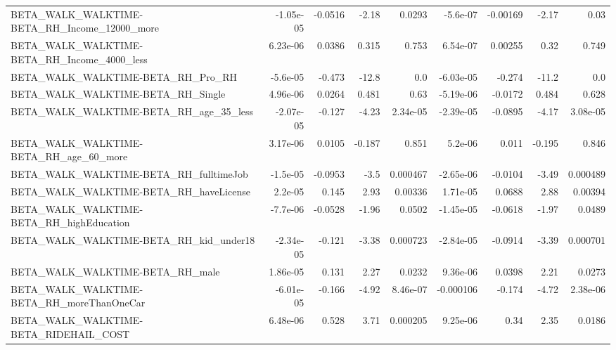 \begin{tabular}{lrrrrrrrr}
BETA\_WALK\_WALKTIME-BETA\_RH\_Income\_12000\_more       &   -1.05e-05 &      -0.0516 &     -2.18 &   0.0293 &   -5.6e-07 &    -0.00169 &        -2.17 &          0.03 \\
BETA\_WALK\_WALKTIME-BETA\_RH\_Income\_4000\_less        &    6.23e-06 &       0.0386 &     0.315 &    0.753 &   6.54e-07 &     0.00255 &         0.32 &         0.749 \\
BETA\_WALK\_WALKTIME-BETA\_RH\_Pro\_RH                  &    -5.6e-05 &       -0.473 &     -12.8 &      0.0 &  -6.03e-05 &      -0.274 &        -11.2 &           0.0 \\
BETA\_WALK\_WALKTIME-BETA\_RH\_Single                  &    4.96e-06 &       0.0264 &     0.481 &     0.63 &  -5.19e-06 &     -0.0172 &        0.484 &         0.628 \\
BETA\_WALK\_WALKTIME-BETA\_RH\_age\_35\_less             &   -2.07e-05 &       -0.127 &     -4.23 & 2.34e-05 &  -2.39e-05 &     -0.0895 &        -4.17 &      3.08e-05 \\
BETA\_WALK\_WALKTIME-BETA\_RH\_age\_60\_more             &    3.17e-06 &       0.0105 &    -0.187 &    0.851 &    5.2e-06 &       0.011 &       -0.195 &         0.846 \\
BETA\_WALK\_WALKTIME-BETA\_RH\_fulltimeJob             &    -1.5e-05 &      -0.0953 &      -3.5 & 0.000467 &  -2.65e-06 &     -0.0104 &        -3.49 &      0.000489 \\
BETA\_WALK\_WALKTIME-BETA\_RH\_haveLicense             &     2.2e-05 &        0.145 &      2.93 &  0.00336 &   1.71e-05 &      0.0688 &         2.88 &       0.00394 \\
BETA\_WALK\_WALKTIME-BETA\_RH\_highEducation           &    -7.7e-06 &      -0.0528 &     -1.96 &   0.0502 &  -1.45e-05 &     -0.0618 &        -1.97 &        0.0489 \\
BETA\_WALK\_WALKTIME-BETA\_RH\_kid\_under18             &   -2.34e-05 &       -0.121 &     -3.38 & 0.000723 &  -2.84e-05 &     -0.0914 &        -3.39 &      0.000701 \\
BETA\_WALK\_WALKTIME-BETA\_RH\_male                    &    1.86e-05 &        0.131 &      2.27 &   0.0232 &   9.36e-06 &      0.0398 &         2.21 &        0.0273 \\
BETA\_WALK\_WALKTIME-BETA\_RH\_moreThanOneCar          &   -6.01e-05 &       -0.166 &     -4.92 & 8.46e-07 &  -0.000106 &      -0.174 &        -4.72 &      2.38e-06 \\
BETA\_WALK\_WALKTIME-BETA\_RIDEHAIL\_COST              &    6.48e-06 &        0.528 &      3.71 & 0.000205 &   9.25e-06 &        0.34 &         2.35 &        0.0186 \\

\end{tabular}
